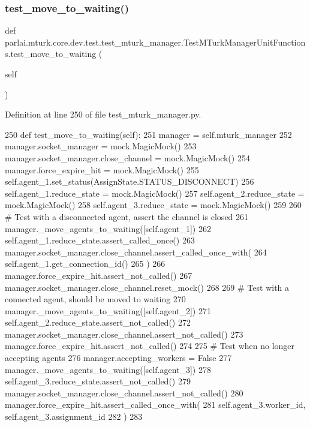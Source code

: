 \subsubsection{\texorpdfstring{test\+\_\+move\+\_\+to\+\_\+waiting()}{test\_move\_to\_waiting()}}
{\footnotesize\ttfamily def parlai.\+mturk.\+core.\+dev.\+test.\+test\+\_\+mturk\+\_\+manager.\+Test\+M\+Turk\+Manager\+Unit\+Functions.\+test\+\_\+move\+\_\+to\+\_\+waiting (\begin{DoxyParamCaption}\item[{}]{self }\end{DoxyParamCaption})}



Definition at line 250 of file test\+\_\+mturk\+\_\+manager.\+py.


\begin{DoxyCode}
250     \textcolor{keyword}{def }test\_move\_to\_waiting(self):
251         manager = self.mturk\_manager
252         manager.socket\_manager = mock.MagicMock()
253         manager.socket\_manager.close\_channel = mock.MagicMock()
254         manager.force\_expire\_hit = mock.MagicMock()
255         self.agent\_1.set\_status(AssignState.STATUS\_DISCONNECT)
256         self.agent\_1.reduce\_state = mock.MagicMock()
257         self.agent\_2.reduce\_state = mock.MagicMock()
258         self.agent\_3.reduce\_state = mock.MagicMock()
259 
260         \textcolor{comment}{# Test with a disconnected agent, assert the channel is closed}
261         manager.\_move\_agents\_to\_waiting([self.agent\_1])
262         self.agent\_1.reduce\_state.assert\_called\_once()
263         manager.socket\_manager.close\_channel.assert\_called\_once\_with(
264             self.agent\_1.get\_connection\_id()
265         )
266         manager.force\_expire\_hit.assert\_not\_called()
267         manager.socket\_manager.close\_channel.reset\_mock()
268 
269         \textcolor{comment}{# Test with a connected agent, should be moved to waiting}
270         manager.\_move\_agents\_to\_waiting([self.agent\_2])
271         self.agent\_2.reduce\_state.assert\_not\_called()
272         manager.socket\_manager.close\_channel.assert\_not\_called()
273         manager.force\_expire\_hit.assert\_not\_called()
274 
275         \textcolor{comment}{# Test when no longer accepting agents}
276         manager.accepting\_workers = \textcolor{keyword}{False}
277         manager.\_move\_agents\_to\_waiting([self.agent\_3])
278         self.agent\_3.reduce\_state.assert\_not\_called()
279         manager.socket\_manager.close\_channel.assert\_not\_called()
280         manager.force\_expire\_hit.assert\_called\_once\_with(
281             self.agent\_3.worker\_id, self.agent\_3.assignment\_id
282         )
283 
\end{DoxyCode}
